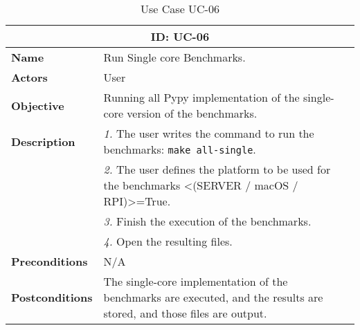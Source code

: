 \begin{table}[H]
    \centering
    \begin{tabular}{l p{10cm}}
        \toprule
        \multicolumn{2}{c}{\textbf{ID: UC-06}} \\
        \toprule
        \textbf{Name}                         &  Run Single core Benchmarks. \\
        \textbf{Actors}                       &  User \\
        \textbf{Objective}                    &  Running all Pypy implementation of the single-core version of the benchmarks. \\
        \multirow{1}{*}{\textbf{Description}} & \textsl{1.} The user writes the command to run the benchmarks: \texttt{make all-single}.\\
                                              & \textsl{2.} The user defines the platform to be used for the benchmarks <(SERVER / macOS / RPI)>=True.\\
                                              & \textsl{3.} Finish the execution of the benchmarks.\\
                                              & \textsl{4.} Open the resulting files.\\ 
        \textbf{Preconditions}                &  N/A \\
        \textbf{Postconditions}               &  The single-core implementation of the benchmarks are executed, and the results are stored, and those files are output. \\
    \end{tabular}
    \caption{Use Case UC-06}
    \label{tab:uc-06}
\end{table}

